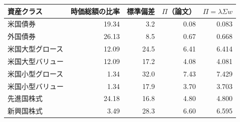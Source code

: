 \begin{tabular}{lrrrr}
\toprule
資産クラス & 時価総額の比率 & 標準偏差 & $\Pi$（論文） & $\Pi=\lambda\Sigma w$ \\
\midrule
米国債券 & 19.34 & 3.2 & 0.08 & 0.083 \\
外国債券 & 26.13 & 8.5 & 0.67 & 0.668 \\
米国大型グロース & 12.09 & 24.5 & 6.41 & 6.414 \\
米国大型バリュー & 12.09 & 17.2 & 4.08 & 4.081 \\
米国小型グロース & 1.34 & 32.0 & 7.43 & 7.429 \\
米国小型バリュー & 1.34 & 17.9 & 3.70 & 3.703 \\
先進国株式 & 24.18 & 16.8 & 4.80 & 4.800 \\
新興国株式 & 3.49 & 28.3 & 6.60 & 6.595 \\
\bottomrule
\end{tabular}
